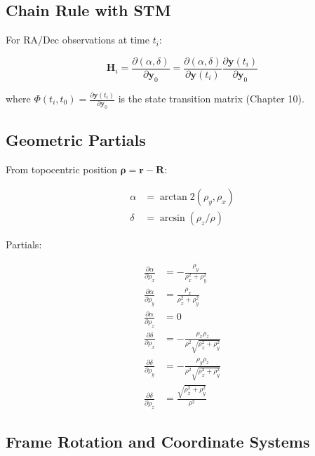\subsection{Chain Rule with STM}

For RA/Dec observations at time $t_i$:

\begin{equation}
    \mathbf{H}_i = \frac{\partial (\alpha, \delta)}{\partial \mathbf{y}_0} = \frac{\partial (\alpha, \delta)}{\partial \mathbf{y}(t_i)} \frac{\partial \mathbf{y}(t_i)}{\partial \mathbf{y}_0}
\end{equation}

where $\Phi(t_i, t_0) = \frac{\partial \mathbf{y}(t_i)}{\partial \mathbf{y}_0}$ is the state transition matrix (Chapter 10).

\subsection{Geometric Partials}

From topocentric position $\boldsymbol{\rho} = \mathbf{r} - \mathbf{R}$:

\begin{align}
    \alpha &= \arctan2(\rho_y, \rho_x) \\
    \delta &= \arcsin(\rho_z / \rho)
\end{align}

Partials:

\begin{align}
    \frac{\partial \alpha}{\partial \rho_x} &= -\frac{\rho_y}{\rho_x^2 + \rho_y^2} \\
    \frac{\partial \alpha}{\partial \rho_y} &= \frac{\rho_x}{\rho_x^2 + \rho_y^2} \\
    \frac{\partial \alpha}{\partial \rho_z} &= 0 \\
    \frac{\partial \delta}{\partial \rho_x} &= -\frac{\rho_x \rho_z}{\rho^2 \sqrt{\rho_x^2 + \rho_y^2}} \\
    \frac{\partial \delta}{\partial \rho_y} &= -\frac{\rho_y \rho_z}{\rho^2 \sqrt{\rho_x^2 + \rho_y^2}} \\
    \frac{\partial \delta}{\partial \rho_z} &= \frac{\sqrt{\rho_x^2 + \rho_y^2}}{\rho^2}
\end{align}

\subsection{Frame Rotation and Coordinate Systems}

